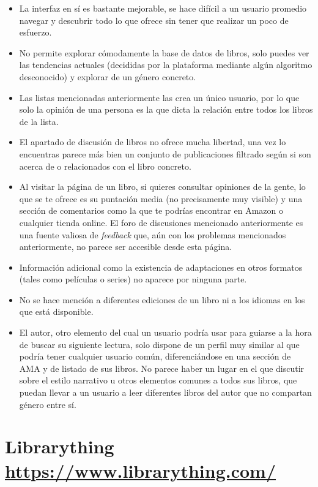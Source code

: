 \begin{itemize}
    \item La interfaz en sí es bastante mejorable, se hace difícil a un usuario promedio navegar y descubrir todo lo que ofrece sin tener que realizar un poco de esfuerzo.
    \item No permite explorar cómodamente la base de datos de libros, solo puedes ver las tendencias actuales (decididas por la plataforma mediante algún algoritmo desconocido) y explorar de un género concreto.
    \item Las listas mencionadas anteriormente las crea un único usuario, por lo que solo la opinión de una persona es la que dicta la relación entre todos los libros de la lista.
    \item El apartado de discusión de libros no ofrece mucha libertad, una vez lo encuentras parece más bien un conjunto de publicaciones filtrado según si son acerca de o relacionados con el libro concreto.
    \item Al visitar la página de un libro, si quieres consultar opiniones de la gente, lo que se te ofrece es su puntación media (no precisamente muy visible) y una sección de comentarios como la que te podrías encontrar en Amazon o cualquier tienda online. El foro de discusiones mencionado anteriormente es una fuente valiosa de \textit{feedback} que, aún con los problemas mencionados anteriormente, no parece ser accesible desde esta página.
    \item Información adicional como la existencia de adaptaciones en otros formatos (tales como películas o series) no aparece por ninguna parte.
    \item No se hace mención a diferentes ediciones de un libro ni a los idiomas en los que está disponible.
    \item El autor, otro elemento del cual un usuario podría usar para guiarse a la hora de buscar su siguiente lectura, solo dispone de un perfil muy similar al que podría tener cualquier usuario común, diferenciándose en una sección de AMA y de listado de sus libros. No parece haber un lugar en el que discutir sobre el estilo narrativo u otros elementos comunes a todos sus libros, que puedan llevar a un usuario a leer diferentes libros del autor que no compartan género entre sí.
\end{itemize}

\section[Librarything]{Librarything\\ {\large \url{https://www.librarything.com/}}}

